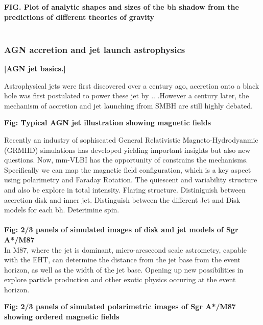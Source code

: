 {\bf FIG. Plot of analytic shapes and sizes of the bh shadow from the predictions of different theories of gravity}\\
~\\
\subsubsection{AGN accretion and jet launch astrophysics} 

{\bf [AGN jet basics.]}

Astrophysical jets were first discovered over a century ago, accretion onto a black hole was first postulated to power these jet by .. .However a century later, the mechanism of accretion and jet launching ifrom SMBH are still highly debated. 

\textbf{Fig: Typical AGN jet illustration showing magnetic fields }

Recently an industry of sophiscated General Relativistic Magneto-Hydrodyanmic (GRMHD) simulations has developed yielding important insights but also new questions. Now, mm-VLBI has the opportunity of constrains the mechanisms. Specifically we can map the magnetic field configuration, which is a key aspect using polarimetry and Faraday Rotation. The quiescent and variability structure and also be explore in total intensity. Flaring structure.  Distiniguish between accretion disk and inner jet. Distinguish between the different Jet and Disk models for each bh. Deterimine spin.\\
~\\
\textbf{Fig: 2/3 panels of simulated images of disk and jet models of Sgr A*/M87}\\

In M87, where the jet is dominant, micro-arcsecond scale astrometry, capable with the EHT, can determine the distance from the jet base from the event horizon, as well as the width of the jet base. Opening up new possibilities in explore particle production and other exotic physics occuring at the event horizon. 


\textbf{Fig: 2/3 panels of simulated polarimetric images of Sgr A*/M87 showing ordered magnetic fields}
